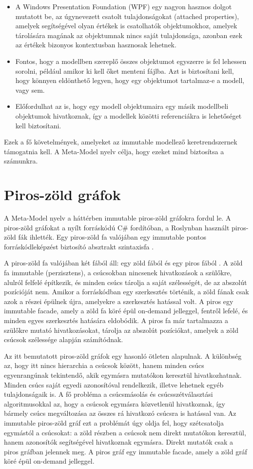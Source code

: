 \documentclass[12pt, a4paper]{report}
\begin{document}
\begin{itemize}
	\item A Windows Presentation Foundation (WPF) egy nagyon hasznos dolgot mutatott be, az úgynevezett csatolt tulajdonságokat (attached properties), amelyek segítségével olyan értékek is csatolhatók objektumokhoz, amelyek tárolására magának az objektumnak nincs saját tulajdonsága, azonban ezek az értékek bizonyos kontextusban hasznosak lehetnek.
	\item Fontos, hogy a modellben szereplő összes objektumot egyszerre is fel lehessen sorolni, például amikor ki kell őket menteni fájlba. Azt is biztosítani kell, hogy könnyen eldönthető legyen, hogy egy objektumot tartalmaz-e a modell, vagy sem.
	\item Előfordulhat az is, hogy egy modell objektumaira egy másik modellbeli objektumok hivatkoznak, így a modellek közötti referenciákra is lehetőséget kell biztosítani.
\end{itemize}

Ezek a fő követelmények, amelyeket az immutable modellező keretrendszernek támogatnia kell. A Meta-Model nyelv célja, hogy ezeket mind biztosítsa a számunkra.

\section{Piros-zöld gráfok}

A Meta-Model nyelv a háttérben immutable piros-zöld gráfokra fordul le. A piros-zöld gráfokat a nyílt forráskódú C\# fordítóban, a Roslynban használt piros-zöld fák ihlették. Egy piros-zöld fa valójában egy immutable pontos forráskódleképzést biztosító absztrakt szintaxisfa \cite{Jef13}.

A piros-zöld fa valójában két fából áll: egy zöld fából és egy piros fából \cite{Lip12}. A zöld fa immutable (perzisztens), a csúcsokban nincsenek hivatkozások a szülőkre, alulról felfelé építkezik, és minden csúcs tárolja a saját szélességét, de az abszolút pozícióját nem. Amikor a forráskódban egy szerkesztés történik, a zöld fának csak azok a részei épülnek újra, amelyekre a szerkesztés hatással volt. A piros egy immutable facade, amely a zöld fa köré épül on-demand jelleggel, fentről lefelé, és minden egyes szerkesztés hatására eldobódik. A piros fa már tartalmazza a szülőkre mutató hivatkozásokat, tárolja az abszolút pozíciókat, amelyek a zöld csúcsok szélessége alapján számítódnak.

Az itt bemutatott piros-zöld gráfok egy hasonló ötleten alapulnak. A különbség az, hogy itt nincs hierarchia a csúcsok között, hanem minden csúcs egyenrangúnak tekintendő, akik egymásra mutatókon keresztül hivatkozhatnak. Minden csúcs saját egyedi azonosítóval rendelkezik, illetve lehetnek egyéb tulajdonságaik is. A fő probléma a csúcsmásolás és csúcsszétválasztási algoritmusokkal az, hogy a csúcsok egymásra közvetlenül hivatkoznak, így bármely csúcs megváltozása az összes rá hivatkozó csúcsra is hatással van. Az immutable piros-zöld gráf ezt a problémát úgy oldja fel, hogy szétcsatolja egymástól a csúcsokat: a zöld részben a csúcsok nem direkt mutatókon keresztül, hanem azonosítók segítségével hivatkoznak egymásra. Direkt mutatók csak a piros gráfban jelennek meg. A piros gráf egy immutable facade, amely a zöld gráf köré épül on-demand jelleggel.
\end{document}
